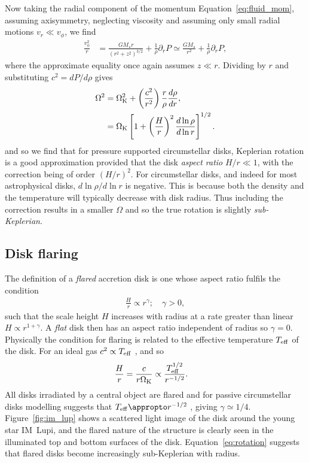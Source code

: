 Now taking the radial component of the momentum Equation~\eqref{eq:fluid_mom}, assuming axisymmetry, neglecting viscosity and assuming only small radial motions $v_r \ll v_\phi$, we find
\begin{align}
    \frac{v_\phi^2}{r} &= \frac{G M_\star r}{\left( r^2 + z^2  \right)^{3/2}} + \frac{1}{\rho} \partial_r P \simeq \frac{G M_\star}{ r^2} + \frac{1}{\rho} \partial_r P, \label{eq:rot_eq_full}
\end{align}
where the approximate equality once again assumes $z \ll r$.
Dividing by $r$ and substituting $c^2=dP/d\rho$ gives
\begin{align}
    \Omega^2 &= \Omega_{\rm K}^2 + \left( \frac{c^2}{r^2} \right) \frac{r}{\rho} \frac{d \rho}{dr}, \\
    &= \Omega_{\rm K} \left[ 1 + \left(\frac{H}{r}\right)^2 \frac{d \ln{\rho}}{d \ln{r}} \right]^{1/2} . \label{eq:rotation}
\end{align}
and so we find that for pressure supported circumstellar disks, Keplerian rotation is a good approximation provided that the disk \textit{aspect ratio} $H/r \ll 1$, with the correction being of order $(H/r)^2$.
For circumstellar disks, and indeed for most astrophysical disks, $d\ln{\rho}/d\ln{r}$ is negative.
This is because both the density and the temperature will typically decrease with disk radius.
Thus including the correction results in a smaller $\Omega$ and so the true rotation is slightly \textit{sub-Keplerian}.

\subsection{Disk flaring} \label{sec:disk_flaring}

The definition of a \textit{flared} accretion disk is one whose aspect ratio fulfils the condition
\begin{align}
    \frac{H}{r} \propto r^\gamma; \quad \gamma > 0, \label{eq:flared_hr}
\end{align}
such that the scale height $H$ increases with radius at a rate greater than linear $H \propto r^{1+\gamma}$. 
A \textit{flat} disk then has an aspect ratio independent of radius so 
$\gamma=0$.
Physically the condition for flaring is related to the effective temperature $T_{\rm eff}$ of the disk.
For an ideal gas $c^2 \propto T_{\rm eff}$ \citep[e.g.][]{pringle2007}, and so
\begin{align}
    \frac{H}{r} &= \frac{c}{r \Omega_{\rm K}} \propto \frac{T_{\rm eff}^{1/2}}{r^{-1/2}}.
\end{align}
All disks irradiated by a central object are flared \citep{kenyon1987} and for passive circumstellar disks modelling suggests that $T_{\rm eff} \appropto r^{-1/2}$ \citep{chiang1997}, giving $\gamma \simeq 1/4$.
Figure~\ref{fig:im_lup} shows a scattered light image of the disk around the young star IM~Lupi, and the flared nature of the structure is clearly seen in the illuminated top and bottom surfaces of the disk.
Equation~\eqref{eq:rotation} suggests that flared disks become increasingly sub-Keplerian with radius.

